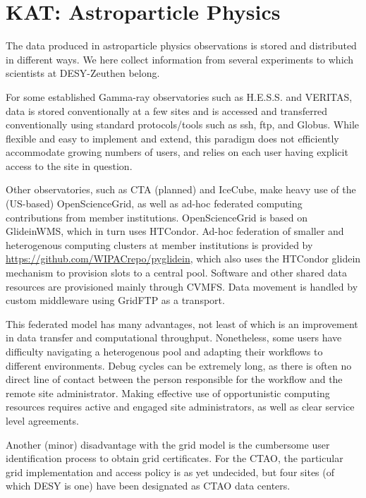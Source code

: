 \section{KAT: Astroparticle Physics} 



The data produced in astroparticle physics observations is stored and 
distributed in different ways. We here collect information from several 
experiments to which scientists at DESY-Zeuthen belong. 

For some established Gamma-ray observatories such as H.E.S.S. and
VERITAS, data is stored conventionally at a few sites and is accessed
and transferred conventionally using standard protocols/tools such as
ssh, ftp, and Globus. While flexible and easy to implement and extend,
this paradigm does not efficiently accommodate growing numbers of users,
and relies on each user having explicit access to the site in question. 

Other observatories, such as CTA (planned) and IceCube, make heavy use
of the (US-based) OpenScienceGrid, as well as ad-hoc federated computing
contributions from member institutions. OpenScienceGrid is based on
GlideinWMS, which in turn uses HTCondor. Ad-hoc federation of smaller
and heterogenous computing clusters at member institutions is provided
by \url{https://github.com/WIPACrepo/pyglidein}, which also uses the
HTCondor glidein mechanism to provision slots to a central pool.
Software and other shared data resources are provisioned mainly through
CVMFS. Data movement is handled by custom middleware using GridFTP as a
transport.

This federated model has many advantages, not least of which is an
improvement in data transfer and computational throughput. Nonetheless,
some users have difficulty navigating a heterogenous pool and adapting
their workflows to different environments. Debug cycles can be extremely
long, as there is often no direct line of contact between the person
responsible for the workflow and the remote site administrator. Making
effective use of opportunistic computing resources requires active and
engaged site administrators, as well as clear service level agreements.

Another (minor) disadvantage with the grid model is the cumbersome user
identification process to obtain grid certificates. For the CTAO, the
particular grid implementation and access policy is as yet undecided, but
four sites (of which DESY is one) have been designated as CTAO data
centers.
